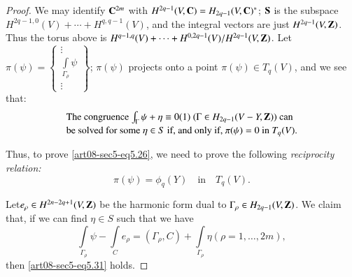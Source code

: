 \begin{proof}
We may identify $\mathbf{C}^{2m}$ with $H^{2q-1}(V,\mathbf{C})=H_{2q-1}(V,\mathbf{C})^{*}$; $\mathbf{S}$ is the subspace $H^{2q-1,0}(V)+\cdots+H^{q,q-1}(V)$, and the integral vectors are just $H^{2q-1}(V,\mathbf{Z})$. Thus the torus above is $H^{q-1,q}(V)+\cdots+H^{0,2q-1}(V)/\break H^{2q-1}(V,\bfZ)$. Let $\pi(\psi)=\left\{\begin{smallmatrix} \vdots\\ \int\limits_{\Gamma_{\rho}}\psi\\ \vdots\end{smallmatrix}\right\}$; $\pi(\psi)$ projects onto a point $\pi(\psi)\in T_{q}(V)$, and we see that:
\begin{equation}
\begin{array}{l}
\text{The congruence $\int_{\Gamma}\psi+\eta\equiv 0(1)$ $(\Gamma\in H_{2q-1}(V-Y,\mathbf{Z}))$ can}\\[2pt]
\text{be solved for some $\eta\in S$ if, and only if, $\pi(\psi)=0$ in $T_{q}(V)$.}
\end{array}\label{art08-sec5-eq5.30}
\end{equation}

Thus, to prove \eqref{art08-sec5-eq5.26}, we need to prove the following {\em reciprocity relation:}
\begin{equation}
\pi(\psi)=\phi_{q}(Y)\text{~~ in~~ } T_{q}(V).\label{art08-sec5-eq5.31}
\end{equation}

Let\pageoriginale $e_{\rho}\in H^{2n-2q+1}(V,\mathbf{Z})$ be the harmonic form dual to $\Gamma_{\rho}\in H_{2q-1}\break (V,\bfZ)$. We claim that, if we can find $\eta\in S$ such that we have
\begin{equation}
\int\limits_{\Gamma_{\rho}}\psi-\int\limits_{C}e_{\rho}=(\Gamma_{\rho},C)+\int\limits_{\Gamma_{\rho}}\eta(\rho=1,\ldots,2m),\label{art08-sec5-eq5.32}
\end{equation}
then \eqref{art08-sec5-eq5.31} holds.
\end{proof}

